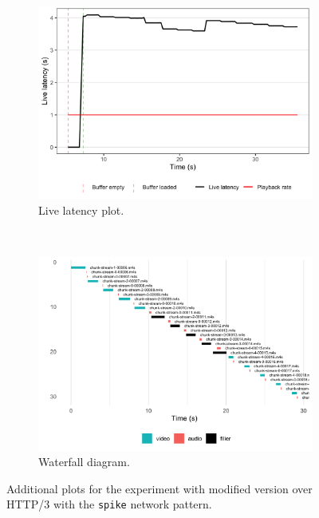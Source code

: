 \begin{figure}[H]
	\centering
	
	\begin{subfigure}[t]{0.45\textwidth}
		\centering
		\includegraphics[width=\textwidth]{res/impr_hls_filler_latency.png}
		\caption{Live latency plot.}
		\label{fig:filler2_latency}
	\end{subfigure}%
	~ 
	\begin{subfigure}[t]{0.45\textwidth}
		\centering
		\includegraphics[width=\textwidth]{res/impr_hls_filler_waterfall.png}
		\caption{Waterfall diagram.}
		\label{fig:filler2_waterfall}
	\end{subfigure}
	
	\caption{Additional plots for the experiment with modified \hlsjs{} version over HTTP/3 with the \texttt{spike} network pattern.}
	\label{fig:filler2}
\end{figure}

